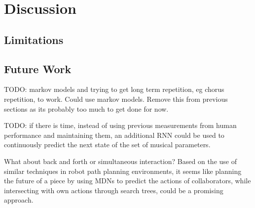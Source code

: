 \chapter{Discussion}\label{chap:discussion}

\section{Limitations}

\section{Future Work}
TODO: markov models and trying to get long term repetition, eg chorus repetition, to work. Could use markov models. Remove this from previous sections as its probably too much to get done for now.

TODO: if there is time, instead of using previous measurements from human performance and maintaining them, an additional RNN could be used to continuously predict the next state of the set of musical parameters.

What about back and forth or simultaneous interaction? Based on the use of similar techniques in robot path planning environments, it seems like planning the future of a piece by using MDNs to predict the actions of collaborators, while intersecting with own actions through search trees, could be a promising approach.